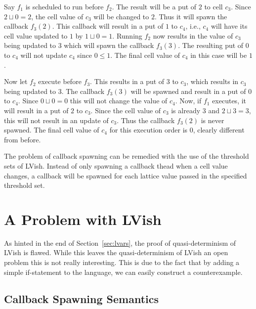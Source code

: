 Say $f_1$ is scheduled to run before $f_2$. The result will be a put of $2$ to
cell $c_3$.  Since $2 \sqcup 0 = 2$, the cell value of $c_3$ will be changed to
$2$. Thus it will spawn the callback $f_3(2)$. This callback will result in a
put of $1$ to $c_4$, i.e., $c_4$ will have its cell value updated to $1$ by $1
\sqcup 0 = 1$.  Running $f_2$ now results in the value of $c_3$ being updated to
$3$ which will spawn the callback $f_3(3)$. The resulting put of $0$ to $c_4$
will not update $c_4$ since $0 \leq 1$. The final cell value of $c_4$ in this
case will be $1$.

Now let $f_2$ execute before $f_3$. This results in a put of $3$ to $c_3$, which
results in $c_3$ being updated to $3$. The callback $f_3(3)$ will be spawned and
result in a put of $0$ to $c_4$. Since $0 \sqcup 0 = 0$ this will not change the
value of $c_4$. Now, if $f_1$ executes, it will result in a put of $2$ to $c_3$.
Since the cell value of $c_3$ is already $3$ and $2 \sqcup 3 = 3$, this will not
result in an update of $c_3$. Thus the callback $f_3(2)$ is never spawned. The
final cell value of $c_4$ for this execution order is $0$, clearly different
from before.

The problem of callback spawning can be remedied with the use of the threshold
sets of LVish. Instead of only spawning a callback thead when a cell value
changes, a callback will be spawned for each lattice value passed in the
specified threshold set.



\section{A Problem with LVish}%
\label{sec:a_problem_of_lvish}

As hinted in the end of Section~\ref{sec:lvars}, the proof of quasi-determinism
of LVish is flawed. While this leaves the quasi-determinism of LVish an open
problem this is not really interesting. This is due to the fact that by adding a
simple if-statement to the language, we can easily construct a counterexample.

\subsection{Callback Spawning Semantics}%
\label{sub:callback_spawning_semantics_lvish}

